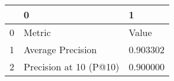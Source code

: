 \begin{tabular}{lll}
\toprule
 & 0 & 1 \\
\midrule
0 & Metric & Value \\
1 & Average Precision & 0.903302 \\
2 & Precision at 10 (P@10) & 0.900000 \\
\bottomrule
\end{tabular}
